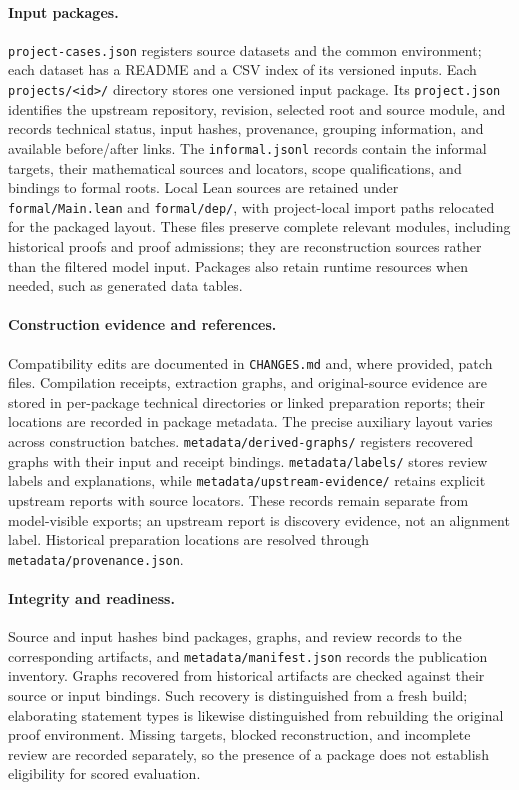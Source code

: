 \paragraph{Input packages.}
\texttt{project-cases.json} registers source datasets and the common environment; each dataset has a README and a CSV index of its versioned inputs.
Each \texttt{projects/<id>/} directory stores one versioned input package.
Its \texttt{project.json} identifies the upstream repository, revision, selected root and source module, and records technical status, input hashes, provenance, grouping information, and available before/after links.
The \texttt{informal.jsonl} records contain the informal targets, their mathematical sources and locators, scope qualifications, and bindings to formal roots.
Local Lean sources are retained under \texttt{formal/Main.lean} and \texttt{formal/dep/}, with project-local import paths relocated for the packaged layout.
These files preserve complete relevant modules, including historical proofs and proof admissions; they are reconstruction sources rather than the filtered model input.
Packages also retain runtime resources when needed, such as generated data tables.

\paragraph{Construction evidence and references.}
Compatibility edits are documented in \texttt{CHANGES.md} and, where provided, patch files.
Compilation receipts, extraction graphs, and original-source evidence are stored in per-package technical directories or linked preparation reports; their locations are recorded in package metadata.
The precise auxiliary layout varies across construction batches.
\texttt{metadata/derived-graphs/} registers recovered graphs with their input and receipt bindings.
\texttt{metadata/labels/} stores review labels and explanations, while \texttt{metadata/upstream-evidence/} retains explicit upstream reports with source locators.
These records remain separate from model-visible exports; an upstream report is discovery evidence, not an alignment label.
Historical preparation locations are resolved through \texttt{metadata/provenance.json}.

\paragraph{Integrity and readiness.}
Source and input hashes bind packages, graphs, and review records to the corresponding artifacts, and \texttt{metadata/manifest.json} records the publication inventory.
Graphs recovered from historical artifacts are checked against their source or input bindings.
Such recovery is distinguished from a fresh build; elaborating statement types is likewise distinguished from rebuilding the original proof environment.
Missing targets, blocked reconstruction, and incomplete review are recorded separately, so the presence of a package does not establish eligibility for scored evaluation.


